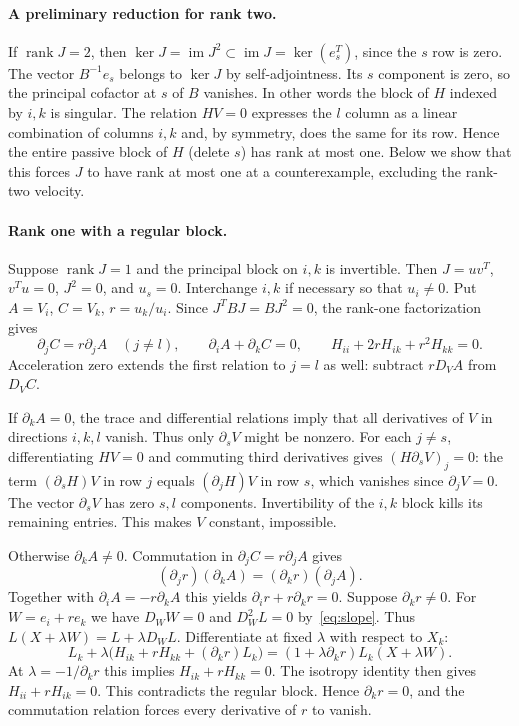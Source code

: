 \documentclass[11pt,a4paper]{article}
\newcommand{\rank}{\operatorname{rank}}
\newcommand{\im}{\operatorname{im}}
\begin{document}
\paragraph{A preliminary reduction for rank two.}
If $\rank J=2$, then $\ker J=\im J^2\subset\im J=\ker(e_s^T)$, since the $s$ row is zero. The vector $B^{-1}e_s$ belongs to $\ker J$ by self-adjointness. Its $s$ component is zero, so the principal cofactor at $s$ of $B$ vanishes. In other words the block of $H$ indexed by $i,k$ is singular. The relation $HV=0$ expresses the $l$ column as a linear combination of columns $i,k$ and, by symmetry, does the same for its row. Hence the entire passive block of $H$ (delete $s$) has rank at most one. Below we show that this forces $J$ to have rank at most one at a counterexample, excluding the rank-two velocity.

\paragraph{Rank one with a regular block.}
Suppose $\rank J=1$ and the principal block on $i,k$ is invertible. Then $J=uv^T$, $v^Tu=0$, $J^2=0$, and $u_s=0$. Interchange $i,k$ if necessary so that $u_i\ne0$. Put $A=V_i$, $C=V_k$, $r=u_k/u_i$. Since $J^TBJ=BJ^2=0$, the rank-one factorization gives
\begin{equation}\label{eq:slope}
 \partial_j C=r\partial_j A\quad(j\ne l),\qquad
 \partial_i A+\partial_k C=0,\qquad
 H_{ii}+2rH_{ik}+r^2H_{kk}=0 .
\end{equation}
Acceleration zero extends the first relation to $j=l$ as well: subtract $rD_VA$ from $D_VC$.

If $\partial_kA=0$, the trace and differential relations imply that all derivatives of $V$ in directions $i,k,l$ vanish. Thus only $\partial_sV$ might be nonzero. For each $j\ne s$, differentiating $HV=0$ and commuting third derivatives gives $(H\partial_sV)_j=0$: the term $(\partial_s H)V$ in row $j$ equals $(\partial_j H)V$ in row $s$, which vanishes since $\partial_jV=0$. The vector $\partial_sV$ has zero $s,l$ components. Invertibility of the $i,k$ block kills its remaining entries. This makes $V$ constant, impossible.

Otherwise $\partial_kA\ne0$. Commutation in $\partial_j C=r\partial_j A$ gives
\[
 (\partial_jr)(\partial_kA)=(\partial_kr)(\partial_jA).
\]
Together with $\partial_i A=-r\partial_k A$ this yields $\partial_i r+r\partial_kr=0$. Suppose $\partial_kr\ne0$. For $W=e_i+r e_k$ we have $D_WW=0$ and $D_W^2L=0$ by~\eqref{eq:slope}. Thus $L(X+\lambda W)=L+\lambda D_WL$. Differentiate at fixed $\lambda$ with respect to $X_k$:
\[
 L_k+\lambda\bigl(H_{ik}+rH_{kk}+(\partial_kr)L_k\bigr)
 =(1+\lambda\partial_kr)L_k(X+\lambda W).
\]
At $\lambda=-1/\partial_kr$ this implies $H_{ik}+rH_{kk}=0$. The isotropy identity then gives $H_{ii}+rH_{ik}=0$. This contradicts the regular block. Hence $\partial_kr=0$, and the commutation relation forces every derivative of $r$ to vanish.
\end{document}
